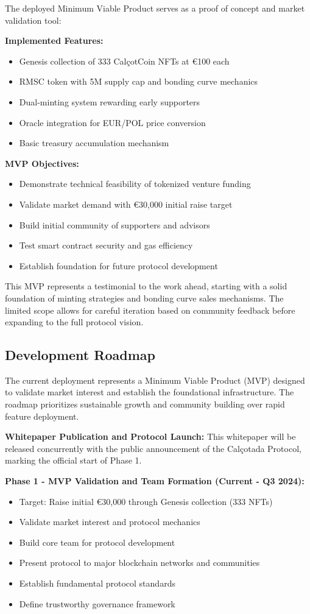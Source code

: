 \documentclass[conference]{IEEEtran}
\begin{document}
The deployed Minimum Viable Product serves as a proof of concept and market validation tool:

\textbf{Implemented Features:}
\begin{itemize}
    \item Genesis collection of 333 CalçotCoin NFTs at €100 each
    \item RMSC token with 5M supply cap and bonding curve mechanics
    \item Dual-minting system rewarding early supporters
    \item Oracle integration for EUR/POL price conversion
    \item Basic treasury accumulation mechanism
\end{itemize}

\textbf{MVP Objectives:}
\begin{itemize}
    \item Demonstrate technical feasibility of tokenized venture funding
    \item Validate market demand with €30,000 initial raise target
    \item Build initial community of supporters and advisors
    \item Test smart contract security and gas efficiency
    \item Establish foundation for future protocol development
\end{itemize}

This MVP represents a testimonial to the work ahead, starting with a solid foundation of minting strategies and bonding curve sales mechanisms. The limited scope allows for careful iteration based on community feedback before expanding to the full protocol vision.

\subsection{Development Roadmap}

The current deployment represents a Minimum Viable Product (MVP) designed to validate market interest and establish the foundational infrastructure. The roadmap prioritizes sustainable growth and community building over rapid feature deployment.

\textbf{Whitepaper Publication and Protocol Launch:}
This whitepaper will be released concurrently with the public announcement of the Calçotada Protocol, marking the official start of Phase 1.

\textbf{Phase 1 - MVP Validation and Team Formation (Current - Q3 2024):}
\begin{itemize}
    \item Target: Raise initial €30,000 through Genesis collection (333 NFTs)
    \item Validate market interest and protocol mechanics
    \item Build core team for protocol development
    \item Present protocol to major blockchain networks and communities
    \item Establish fundamental protocol standards
    \item Define trustworthy governance framework
\end{itemize}
\end{document}
